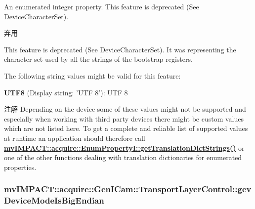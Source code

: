 An enumerated integer property. This feature is deprecated (See Device\+Character\+Set). 

\begin{DoxyRefDesc}{弃用}
\item[\hyperlink{deprecated__deprecated000061}{弃用}]This feature is deprecated (See Device\+Character\+Set). It was representing the character set used by all the strings of the bootstrap registers.\end{DoxyRefDesc}


The following string values might be valid for this feature\+:
\begin{DoxyItemize}
\item {\bfseries U\+T\+F8} (Display string\+: 'U\+T\+F 8')\+: U\+T\+F 8
\end{DoxyItemize}

\begin{DoxyNote}{注解}
Depending on the device some of these values might not be supported and especially when working with third party devices there might be custom values which are not listed here. To get a complete and reliable list of supported values at runtime an application should therefore call {\bfseries \hyperlink{classmv_i_m_p_a_c_t_1_1acquire_1_1_enum_property_i_a0ba6ccbf5ee69784d5d0b537924d26b6}{mv\+I\+M\+P\+A\+C\+T\+::acquire\+::\+Enum\+Property\+I\+::get\+Translation\+Dict\+Strings()}} or one of the other functions dealing with translation dictionaries for enumerated properties. 
\end{DoxyNote}
\hypertarget{classmv_i_m_p_a_c_t_1_1acquire_1_1_gen_i_cam_1_1_transport_layer_control_a50239d950e31b55c2b789ed5069963b4}{
\subsubsection[{gev\+Device\+Mode\+Is\+Big\+Endian}]{ mv\+I\+M\+P\+A\+C\+T\+::acquire\+::\+Gen\+I\+Cam\+::\+Transport\+Layer\+Control\+::gev\+Device\+Mode\+Is\+Big\+Endian}}\label{classmv_i_m_p_a_c_t_1_1acquire_1_1_gen_i_cam_1_1_transport_layer_control_a50239d950e31b55c2b789ed5069963b4}


